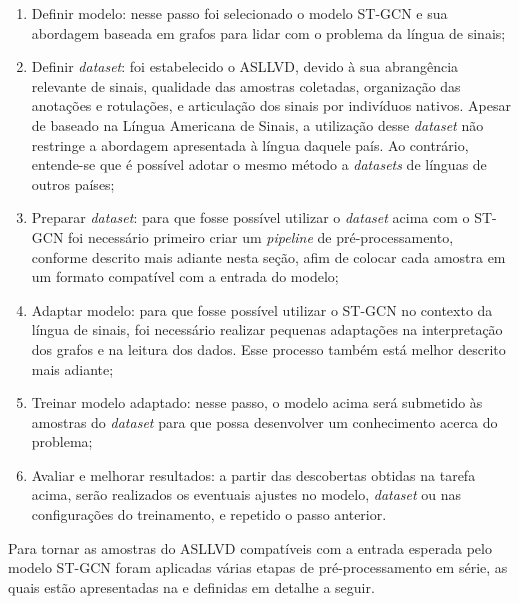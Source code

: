 \begin{enumerate}
    \item Definir modelo: nesse passo foi selecionado o modelo ST-GCN e sua abordagem baseada em grafos para lidar com o problema da língua de sinais;
    \item Definir \textit{dataset}: foi estabelecido o ASLLVD, devido à sua abrangência relevante de sinais, qualidade das amostras coletadas, organização das anotações e rotulações, e articulação dos sinais por indivíduos nativos. Apesar de baseado na Língua Americana de Sinais, a utilização desse \textit{dataset} não restringe a abordagem apresentada à língua daquele país. Ao contrário, entende-se que é possível adotar o mesmo método a \textit{datasets} de línguas de outros países;
    \item Preparar \textit{dataset}: para que fosse possível utilizar o \textit{dataset} acima com o ST-GCN foi necessário primeiro criar um \textit{pipeline} de pré-processamento, conforme descrito mais adiante nesta seção, afim de colocar cada amostra em  um formato compatível com a entrada do modelo;
    \item Adaptar modelo: para que fosse possível utilizar o ST-GCN no contexto da língua de sinais, foi necessário realizar pequenas adaptações na interpretação dos grafos e na leitura dos dados. Esse processo também está melhor descrito mais adiante;
    \item Treinar modelo adaptado: nesse passo, o modelo acima será submetido às amostras do \textit{dataset} para que possa desenvolver um conhecimento acerca do problema;
    \item Avaliar e melhorar resultados: a partir das descobertas obtidas na tarefa acima, serão realizados os eventuais ajustes no modelo, \textit{dataset} ou nas configurações do treinamento, e repetido o passo anterior.
\end{enumerate}


Para tornar as amostras do ASLLVD compatíveis com a entrada esperada pelo modelo ST-GCN foram aplicadas várias etapas de pré-processamento em série, as quais estão apresentadas na  e definidas em detalhe a seguir.


